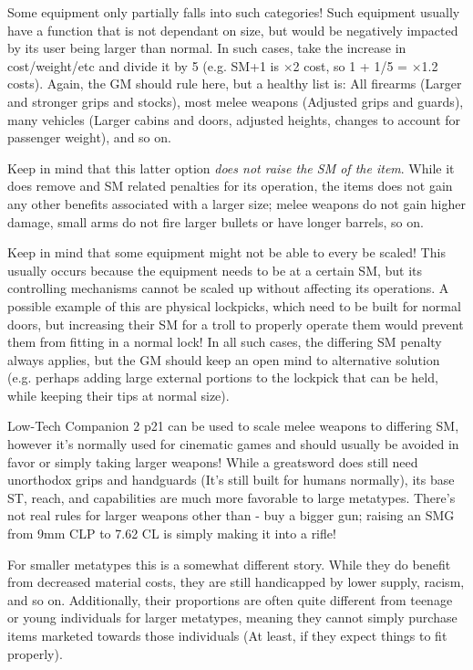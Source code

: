 \begin{multicols*}{3}
	Some equipment only partially falls into such categories! Such equipment usually have a function that is not dependant on size, but would be negatively impacted by its user being larger than normal. In such cases, take the increase in cost/weight/etc and divide it by 5 (e.g. SM+1 is $\times$2 cost, so 1 + 1/5 = $\times$1.2 costs). Again, the GM should rule here, but a healthy list is: All firearms (Larger and stronger grips and stocks), most melee weapons (Adjusted grips and guards), many vehicles (Larger cabins and doors, adjusted heights, changes to account for passenger weight), and so on.
	
	Keep in mind that this latter option \textit{does not raise the SM of the item}. While it does remove and SM related penalties for its operation, the items does not gain any other benefits associated with a larger size; melee weapons do not gain higher damage, small arms do not fire larger bullets or have longer barrels, so on.
	
	Keep in mind that some equipment might not be able to every be scaled! This usually occurs because the equipment needs to be at a certain SM, but its controlling mechanisms cannot be scaled up without affecting its operations. A possible example of this are physical lockpicks, which need to be built for normal doors, but increasing their SM for a troll to properly operate them would prevent them from fitting in a normal lock! In all such cases, the differing SM penalty always applies, but the GM should keep an open mind to alternative solution (e.g. perhaps adding large external portions to the lockpick that can be held, while keeping their tips at normal size).
	
	Low-Tech Companion 2 p21 can be used to scale melee weapons to differing SM, however it's normally used for cinematic games and should usually be avoided in favor or simply taking larger weapons! While a greatsword does still need unorthodox grips and handguards (It's still built for humans normally), its base ST, reach, and capabilities are much more favorable to large metatypes. There's not real rules for larger weapons other than - buy a bigger gun; raising an SMG from 9mm CLP to 7.62 CL is simply making it into a rifle!
	
	For smaller metatypes this is a somewhat different story. While they do benefit from decreased material costs, they are still handicapped by lower supply, racism, and so on. Additionally, their proportions are often quite different from teenage or young individuals for larger metatypes, meaning they cannot simply purchase items marketed towards those individuals (At least, if they expect things to fit properly).
	

\end{multicols*}
